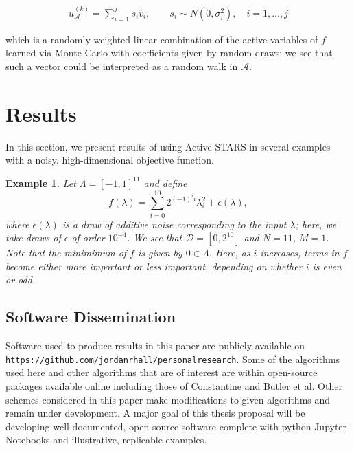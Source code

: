 \documentclass{amsart}
\newcommand{\A}{\mathcal{A}}
\begin{document}
\begin{eqnarray}
u_\A^{(k)}=\sum_{i=1}^j s_i\tilde{v_i}, \quad \quad s_i\sim N(0,\sigma_i^2), \quad i=1,\ldots,j
\end{eqnarray}


\noindent which is a randomly weighted linear combination of the active variables of $f$ learned via Monte Carlo with coefficients given by random draws; we see that such a vector could be interpreted as a random walk in $\A$.



\section{Results}

In this section, we present results of using Active STARS in several examples with a noisy, high-dimensional objective function.

\vspace{.125cm}

\noindent \textbf{Example 1.} \textit{Let $\Lambda=[-1,1]^{11}$ and define $$f(\lambda)=\sum_{i=0}^{10} 2^{(-1)^i i}\lambda_i^2+\epsilon(\lambda),$$ where $\epsilon(\lambda)$ is a draw of additive noise corresponding to the input $\lambda$; here, we take draws of $\epsilon$ of order $10^{-4}$. We see that $\mathcal{D}=[0,2^{10}]$ and $N=11$, $M=1$. Note that the minimimum of $f$ is given by $0 \in \Lambda$. Here, as $i$ increases, terms in $f$ become either more important or less important, depending on whether $i$ is even or odd.}











\subsection{Software Dissemination}

Software used to produce results in this paper are publicly available on \texttt{https://github.com/jordanrhall/personalresearch}. Some of the algorithms used here and other algorithms that are of interest are within open-source packages available online including those of Constantine and Butler et al. Other schemes considered in this paper make modifications to given algorithms and remain under development. A major goal of this thesis proposal will be developing well-documented, open-source software complete with python Jupyter Notebooks and illustrative, replicable examples.
\end{document}
